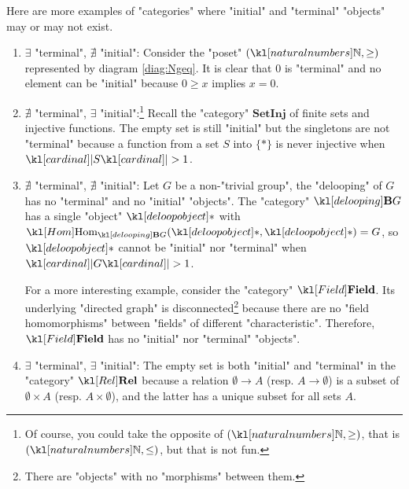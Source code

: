 \documentclass[main.tex]{subfiles}
\begin{document}
\begin{exmps}
	Here are more examples of "categories" where "initial" and "terminal" "objects" may or may not exist.
	\begin{enumerate}
		\begin{marginfigure}[3\baselineskip]
			\begin{equation}\label{diag:Ngeq}
				\begin{tikzcd}
				\stackrel{0}{\bullet}  & \arrow[l] \stackrel{1}{\bullet}  & \arrow[l] \stackrel{2}{\bullet}  & \arrow[l] \cdots
				\end{tikzcd}
			\end{equation}
		\end{marginfigure}
		\item $\exists$ "terminal", $\nexists$ "initial": Consider the "poset" $(\N, \geq)$ represented by diagram \eqref{diag:Ngeq}. It is clear that $0$ is "terminal" and no element can be "initial" because $0 \geq x$ implies $x = 0$.
		
		\item %
		$\nexists$ "terminal", $\exists$ "initial":\footnote{Of course, you could take the opposite of $(\N, \geq)$, that is $(\N, \leq)$, but that is not fun.} Recall the "category" $\mathbf{SetInj}$ of finite sets and injective functions. The empty set is still "initial" but the singletons are not "terminal" because a function from a set $S$ into $\{\ast\}$ is never injective when $\cardinal{S} > 1$.
		\item $\nexists$ "terminal", $\nexists$ "initial": Let $G$ be a non-"trivial group", the "delooping" of $G$ has no "terminal" and no "initial" "objects". The "category" $\deloop{G}$ has a single "object" $\deloopobject$ with $\Hom_{\deloop{G}}(\deloopobject, \deloopobject) = G$, so $\deloopobject$ cannot be "initial" nor "terminal" when $\cardinal{G} > 1$.
		
		For a more interesting example, consider the "category" $\catField$. Its underlying "directed graph" is disconnected\footnote{There are "objects" with no "morphisms" between them.} because there are no "field homomorphisms" between "fields" of different "characteristic". Therefore, $\catField$ has no "initial" nor "terminal" "objects".
		\item $\exists$ "terminal", $\exists$ "initial": The empty set is both "initial" and "terminal" in the "category" $\catRel$ because a relation $\emptyset \rightarrow A$ (resp. $A \rightarrow \emptyset$) is a subset of $\emptyset \times A$ (resp. $A \times \emptyset$), and the latter has a unique subset for all sets $A$.
		

\end{enumerate}
\end{exmps}
\end{document}
